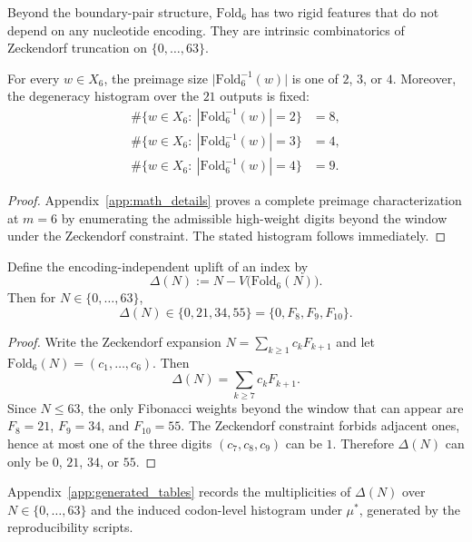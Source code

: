 Beyond the boundary-pair structure, $\mathrm{Fold}_6$ has two rigid features that do not depend on any nucleotide encoding.
They are intrinsic combinatorics of Zeckendorf truncation on $\{0,\dots,63\}$.

\begin{theorem}
\label{thm:fold6_degeneracy}
For every $w\in X_6$, the preimage size $\bigl|\mathrm{Fold}_6^{-1}(w)\bigr|$ is one of $2$, $3$, or $4$.
Moreover, the degeneracy histogram over the $21$ outputs is fixed:
\[
\begin{aligned}
\#\{w\in X_6:\ |\mathrm{Fold}_6^{-1}(w)|=2\}&=8,\\
\#\{w\in X_6:\ |\mathrm{Fold}_6^{-1}(w)|=3\}&=4,\\
\#\{w\in X_6:\ |\mathrm{Fold}_6^{-1}(w)|=4\}&=9.
\end{aligned}
\]
\end{theorem}

\begin{proof}
Appendix~\ref{app:math_details} proves a complete preimage characterization at $m=6$ by enumerating the admissible high-weight digits beyond the window under the Zeckendorf constraint.
The stated histogram follows immediately.
\end{proof}

\begin{lemma}
\label{lem:delta_values}
Define the encoding-independent uplift of an index by
\[
\Delta(N):=N-V\bigl(\mathrm{Fold}_6(N)\bigr).
\]
Then for $N\in\{0,\dots,63\}$,
\[
\Delta(N)\in\{0,21,34,55\}=\{0,F_8,F_9,F_{10}\}.
\]
\end{lemma}

\begin{proof}
Write the Zeckendorf expansion $N=\sum_{k\ge 1} c_k F_{k+1}$ and let $\mathrm{Fold}_6(N)=(c_1,\dots,c_6)$.
Then
\[
\Delta(N)=\sum_{k\ge 7} c_k F_{k+1}.
\]
Since $N\le 63$, the only Fibonacci weights beyond the window that can appear are $F_8=21$, $F_9=34$, and $F_{10}=55$.
The Zeckendorf constraint forbids adjacent ones, hence at most one of the three digits $(c_7,c_8,c_9)$ can be $1$.
Therefore $\Delta(N)$ can only be $0$, $21$, $34$, or $55$.
\end{proof}

\begin{remark}
Appendix~\ref{app:generated_tables} records the multiplicities of $\Delta(N)$ over $N\in\{0,\dots,63\}$ and the induced codon-level histogram under $\mu^\ast$, generated by the reproducibility scripts.
\end{remark}

